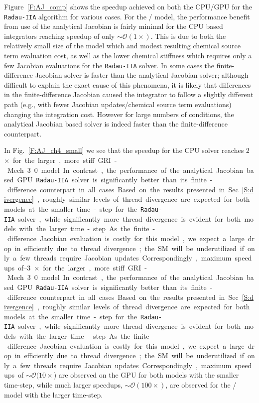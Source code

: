 \documentclass[final,twocolumn]{elsarticle}
\begin{document}
Figure~\ref{F:AJ_comp} shows the speedup achieved on both the CPU\slash GPU for the \texttt{Radau-IIA} algorithm for various cases.
For the \slash{} model, the performance benefit from use of the analytical Jacobian is fairly minimal for the CPU based integrators reaching speedup of only $\sim\mathcal{O}(1\times)$.
This is due to both the relatively small size of the model which and modest resulting chemical source term evaluation cost, as well as the lower chemical stiffness which requires only a few Jacobian evaluations for the \texttt{Radau-IIA} solver.
In some cases the finite-difference Jacobian solver is faster than the analytical Jacobian solver; although difficult to explain the exact cause of this phenomena, it is likely that differences in the finite-difference Jacobian caused the integrator to follow a slightly different path (e.g., with fewer Jacobian updates\slash chemical source term evaluations) changing the integration cost.
However for large numbers of conditions, the analytical Jacobian based solver is indeed faster than the finite-difference counterpart.

In Fig.~\ref{F:AJ_ch4_small} we see that the speedup for the CPU solver reaches \SIrange{2}{3}{$\times$} for the larger, more stiff GRI-Mech 3.0 model.
In contrast, the performance of the analytical Jacobian based GPU \texttt{Radau-IIA} solver is significantly better than its finite-difference counterpart in all cases.
Based on the results presented in Sec.~\ref{S:divergence}, roughly similar levels of thread divergence are expected for both models at the smaller time-step for the \texttt{Radau-IIA} solver, while significantly more thread divergence is evident for both models with the larger time-step.
As the finite-difference Jacobian evaluation is costly for this model, we expect a large drop in efficiently due to thread divergence; the SM will be underutilized if only a few threads require Jacobian updates.
Correspondingly, maximum speedups of $\sim\mathcal{O}(10\times$) are observed on the GPU for both models with the smaller time-step, while much larger speedups, $\sim\mathcal{O}(100\times)$, are observed for the \slash{} model with the larger time-step.
\end{document}
